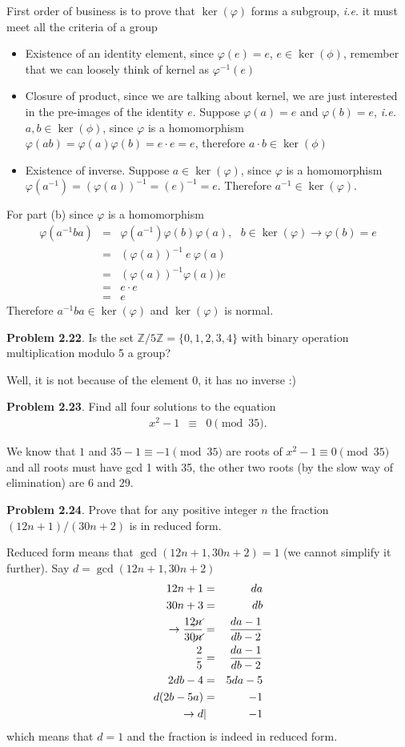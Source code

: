\documentclass[aps,preprint,preprintnumbers,nofootinbib,showpacs,prd]{revtex4-1}
\newcommand{\ie}{{\it i.e.} }
\newcommand{\bit}{\begin{itemize}}
\newcommand{\eit}{\end{itemize}}
\newcommand{\nbea}{\begin{eqnarray*}}
\newcommand{\neea}{\end{eqnarray*}}
\begin{document}
First order of business is to prove that $\ker(\varphi)$ forms a subgroup, \ie it must meet all the criteria of a group
\bit
\item Existence of an identity element, since $\varphi(e) = e$, $e \in \ker(\phi)$, remember that we can loosely think of kernel as $\varphi^{-1}(e)$
\item Closure of product, since we are talking about kernel, we are just interested in the pre-images of the identity $e$. Suppose $\varphi(a) = e$ and $\varphi(b)=e$, \ie $a,b \in \ker(\phi)$, since $\varphi$ is a homomorphism $\varphi(ab) = \varphi(a)\varphi(b) = e \cdot e = e$, therefore $a\cdot b \in \ker(\phi)$
\item Existence of inverse. Suppose $a \in \ker(\varphi)$, since $\varphi$ is a homomorphism $\varphi(a^{-1}) = (\varphi(a))^{-1} = (e)^{-1} = e$. Therefore $a^{-1} \in \ker(\varphi)$.
\eit

For part (b) since $\varphi$ is a homomorphism 
%
\nbea
\varphi(a^{-1} ba) & = & \varphi(a^{-1}) \varphi(b) \varphi(a), ~~~ b \in \ker(\varphi) \to \varphi(b) = e \\
& = & (\varphi(a))^{-1}~ e ~ \varphi(a) \\
& = & (\varphi(a))^{-1} \varphi(a)) e \\
& = & e \cdot e \\
& = & e
\neea
%
Therefore $a^{-1} ba \in \ker(\varphi)$ and $\ker(\varphi)$ is normal.

{\bf Problem 2.22}. Is the set $\mathbb{Z}/5\mathbb{Z} = \{0, 1, 2, 3, 4\}$ with binary operation multiplication
modulo 5 a group?

Well, it is not because of the element 0, it has no inverse :)

{\bf Problem 2.23}. Find all four solutions to the equation
%
\nbea
x^2 - 1 & \equiv & 0 \pmod{35}.
\neea
%

We know that $1$ and $35-1 \equiv -1 \pmod{35}$ are roots of $x^2-1\equiv 0 \pmod{35}$ and all roots must have gcd 1 with 35,  the other two roots (by the slow way of elimination) are $6$ and $29$.

{\bf Problem 2.24}. Prove that for any positive integer $n$ the fraction $(12n + 1)/(30n + 2)$ is in reduced form.

Reduced form means that $\gcd(12n + 1, 30n + 2) = 1$ (we cannot simplify it further). Say $d = \gcd(12n + 1, 30n + 2)$
%
\nbea
12n + 1 & = & da \\
30n + 3 & = & db \\
\to \frac{12\cancel{n}}{30\cancel{n}} & = & \frac{da - 1}{db - 2} \\
\frac{2}{5} & = & \frac{da - 1}{db - 2} \\
2db - 4 & = & 5da - 5 \\
d(2b - 5a) & = & -1 \\
\to d &|& -1
\neea
%
which means that $d=1$ and the fraction is indeed in reduced form.
\end{document}
